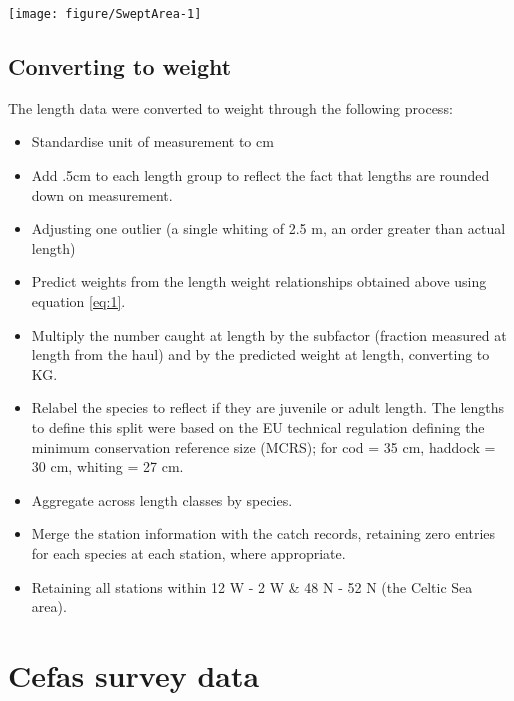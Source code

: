\documentclass[12pt]{article}\usepackage[]{graphicx}\usepackage[]{color}
\makeatletter
\def\maxwidth{ %
  \ifdim\Gin@nat@width>\linewidth
    \linewidth
  \else
    \Gin@nat@width
  \fi
}
\newenvironment{knitrout}{}{} %
\makeatother
\begin{document}
\begin{knitrout}\footnotesize
{}\color{fgcolor}

{\centering \texttt{[image: figure/SweptArea-1]} 

}



\end{knitrout}

\subsection{Converting to weight}

The length data were converted to weight through the following process:

\begin{itemize}
	\item Standardise unit of measurement to cm
	\item Add .5cm to each length group to reflect the fact that lengths
		are rounded down on measurement.
	\item Adjusting one outlier (a single whiting of 2.5 m, an order
		greater than actual length) 
	\item Predict weights from the length weight relationships obtained
		above using equation \ref{eq:1}.
	\item Multiply the number caught at length by the subfactor (fraction
		measured at length from the haul) and by the predicted weight
		at length, converting to KG.
	\item Relabel the species to reflect if they are juvenile or adult
		length. The lengths to define this split were based on the EU
		technical regulation defining the minimum conservation
		reference size (MCRS); for cod = 35 cm, haddock = 30 cm,
		whiting = 27 cm.
	\item Aggregate across length classes by species.
	\item Merge the station information with the catch records, retaining
		zero entries for each species at each station, where
		appropriate.
	\item Retaining all stations within 12 W - 2 W \&  48 N - 52 N (the
		Celtic Sea area).
\end{itemize}

\section{Cefas survey data}
\end{document}
